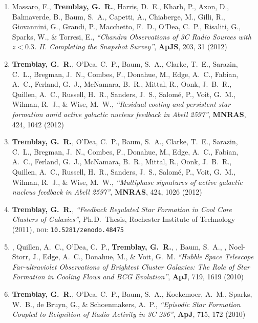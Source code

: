 \documentclass[11pt]{article}
\begin{document}
\begin{enumerate}
\item Massaro, F., \textbf{Tremblay, G.~R.}, Harris, D.~E., Kharb, P., Axon, D.,
Balmaverde, B., Baum, S.~A., Capetti, A., Chiaberge, M., Gilli, R.,
Giovannini, G., Grandi, P., Macchetto, F.~D., O'Dea, C.~P., Risaliti, G.,
Sparks, W., \& Torresi, E.,  \textit{``Chandra Observations of 3C Radio Sources with $z < 0.3$. II. Completing the Snapshot Survey''}, \textbf{ApJS}, 203,  31 (2012)


\item \textbf{Tremblay, G.~R.}, O'Dea, C.~P., Baum, S.~A., Clarke, T.~E., Sarazin,
C.~L., Bregman, J.~N., Combes, F., Donahue, M., Edge, A.~C., Fabian, A.~C.,
Ferland, G.~J., McNamara, B.~R., Mittal, R., Oonk, J.~B.~R., Quillen,
A.~C., Russell, H.~R., Sanders, J.~S., Salom{\'e}, P., Voit, G.~M., Wilman,
R.~J., \& Wise, M.~W., \textit{``Residual cooling and persistent star formation amid active galactic nucleus feedback in Abell 2597''}, \textbf{MNRAS}, 424,  1042 (2012)


\item \textbf{Tremblay, G.~R.}, O'Dea, C.~P., Baum, S.~A., Clarke, T.~E., Sarazin,
C.~L., Bregman, J.~N., Combes, F., Donahue, M., Edge, A.~C., Fabian, A.~C.,
Ferland, G.~J., McNamara, B.~R., Mittal, R., Oonk, J.~B.~R., Quillen,
A.~C., Russell, H.~R., Sanders, J.~S., Salom{\'e}, P., Voit, G.~M., Wilman,
R.~J., \& Wise, M.~W., \textit{ ``Multiphase signatures of active galactic nucleus feedback in Abell 2597''}, \textbf{MNRAS}, 424,  1026 (2012)



\item \textbf{Tremblay, G.~R.}, \textit{``Feedback Regulated Star Formation in Cool Core
Clusters of Galaxies''}, Ph.D.~Thesis, Rochester Institute of Technology (2011), \textsc{doi}: \texttt{10.5281/zenodo.48475}



\item {}, Quillen, A.~C., O'Dea, C.~P., \textbf{Tremblay, G.~R.}, , Baum, S.~A., , Noel-Storr, J., Edge, A.~C., Donahue,
M., \& Voit, G.~M.  \textit{``Hubble Space Telescope Far-ultraviolet Observations of Brightest Cluster Galaxies: The Role of Star Formation in Cooling Flows and BCG Evolution''}, \textbf{ApJ}, 719,  1619 (2010)



\item \textbf{Tremblay, G.~R.}, O'Dea, C.~P., Baum, S.~A., Koekemoer, A.~M., Sparks,
W.~B., de Bruyn, G.,
\& Schoenmakers, A.~P.,  \textit{``Episodic Star Formation Coupled to Reignition of Radio Activity in 3C 236''}, \textbf{ApJ}, 715,  172 (2010)





\end{enumerate}
\end{document}
